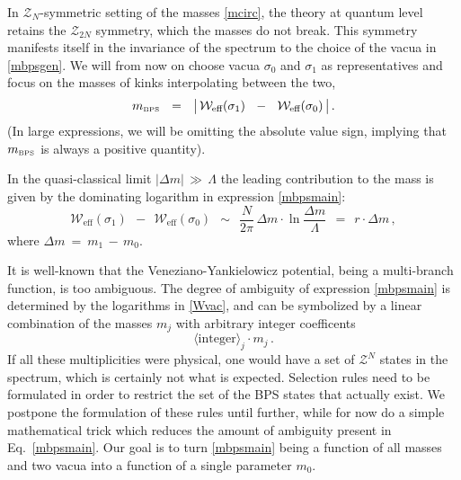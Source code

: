 \documentclass[epsfig,12pt]{article}
\def\beq{\begin{equation}}
\def\eeq{\end{equation}}
\def\beq{\begin{equation}}
\def\eeq{\end{equation}}
\newcommand{\mc}[1]{\mathcal{#1}}
\newcommand{\mbps}{m_{\text{\tiny BPS}}}
\newcommand{\W}{\mathcal{W}}
\begin{document}
	In $ \mc{Z}_N $-symmetric setting of the masses \eqref{mcirc}, the theory at quantum level
	retains the $ \mc{Z}_{2N} $ symmetry, which the masses do not break.
	This symmetry manifests itself in the invariance of the spectrum 
	to the choice of the vacua in \eqref{mbpsgen}.
	We will from now on choose vacua $ \sigma_0 $ and $ \sigma_1 $ as representatives
	and focus on the masses of kinks interpolating between the two,
\beq
\label{mbpsmain}
	\mbps ~~=~~ \big|\, \W_\text{eff} ( \sigma_1 ) ~~-~~ \W_\text{eff} ( \sigma_0 ) \,\big| \,.
\eeq
	(In large expressions, we will be omitting the absolute value sign, implying that $ \mbps $
	is always a positive quantity).

	In the quasi-classical limit $ |\Delta m| \,\gg\, \Lambda $ the leading contribution to the mass
	is given by the dominating logarithm in expression \eqref{mbpsmain}:
\beq
\label{wkink}
	\W_\text{eff} ( \sigma_1 ) ~~-~~ \W_\text{eff} ( \sigma_0 ) ~~\sim~~
		\frac{N}{2\pi}\,
		\Delta m \cdot \ln \frac{\Delta m}{\Lambda} ~~=~~  r \cdot \Delta m\,, 
\eeq
	where $ \Delta m ~=~ m_1 \,-\, m_0 $.

	It is well-known that the Veneziano-Yankielowicz potential, being a multi-branch function,
	is too ambiguous.
	The degree of ambiguity of expression \eqref{mbpsmain} is determined by the logarithms in \eqref{Wvac},
	and can be symbolized by a linear combination of the masses $ m_j $ with arbitrary integer coefficents
\beq
\label{amb}
	\langle\text{integer}\rangle_j \cdot m_j \,.
\eeq
	If all these multiplicities were physical, one would have a set of $ \mc{Z}^N $ states in the spectrum, which
	is certainly not what is expected.
	Selection rules need to be formulated in order to restrict the set of the BPS states
	that actually exist.
	We postpone the formulation of these rules until further, while for now do a simple mathematical
	trick which reduces the amount of ambiguity present in Eq.~\eqref{mbpsmain}.
	Our goal is to turn \eqref{mbpsmain} being a function of all masses and two vacua into a function
	of a single parameter $ m_0 $.
\end{document}
